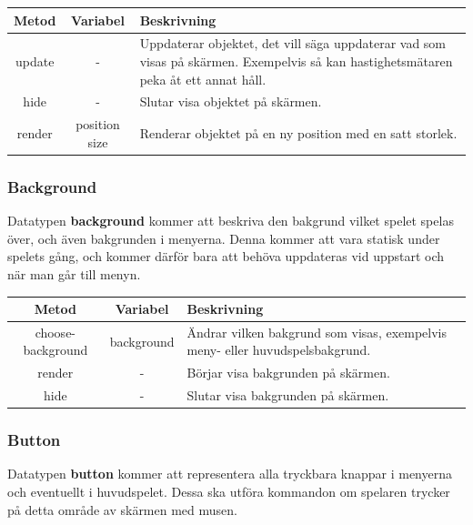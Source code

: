 \documentclass[12pt,a4paper]{article}
\begin{document}
\vspace{0.2cm}

\begin{tabular}{| c | c | p{8.8cm} |}
	\hline
	\textbf{Metod} & \textbf{Variabel} & \textbf{Beskrivning} \\
	\hline
	
	update & - & Uppdaterar objektet, det vill säga uppdaterar vad som visas på skärmen. Exempelvis så kan hastighetsmätaren peka åt ett annat håll.\\
	\hline
	hide & - & Slutar visa objektet på skärmen. \\
	\hline
	render & position size & Renderar objektet på en ny position med en satt storlek. \\
	\hline
\end{tabular}


\subsubsection{Background}
Datatypen \textbf{background} kommer att beskriva den bakgrund vilket spelet spelas över, och även bakgrunden i menyerna. Denna kommer att vara statisk under spelets gång, och kommer därför bara att behöva uppdateras vid uppstart och när man går till menyn.

\vspace{0.2cm}

\begin{tabular}{| c | c | p{7cm} |}
	\hline
	\textbf{Metod} & \textbf{Variabel} & \textbf{Beskrivning} \\
	\hline
	
	choose-background & background & Ändrar vilken bakgrund som visas, exempelvis meny- eller huvudspelsbakgrund.\\
	\hline
	render & - & Börjar visa bakgrunden på skärmen. \\
	\hline
	hide & - & Slutar visa bakgrunden på skärmen. \\
	\hline
\end{tabular}

\subsubsection{Button}
Datatypen \textbf{button} kommer att representera alla tryckbara knappar i menyerna och eventuellt i huvudspelet. Dessa ska utföra kommandon om spelaren trycker på detta område av skärmen med musen.

\vspace{0.2cm}
\end{document}
